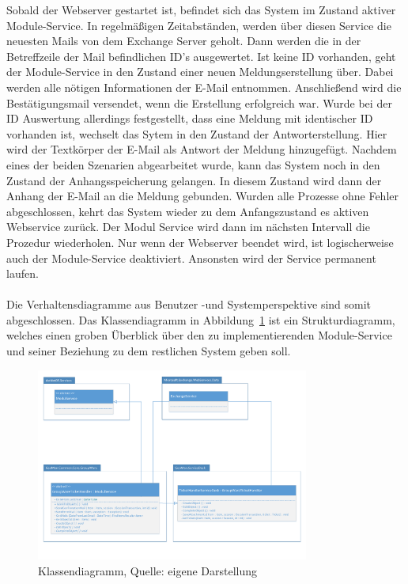 \noindent
Sobald der Webserver gestartet ist, befindet sich das System im Zustand aktiver Module-Service. In regelmäßigen Zeitabständen, werden über diesen Service die neuesten Mails von dem Exchange Server geholt. Dann werden die in der Betreffzeile der Mail befindlichen ID's ausgewertet. Ist keine ID vorhanden, geht der Module-Service in den Zustand einer neuen Meldungserstellung über. Dabei werden alle nötigen Informationen der E-Mail entnommen. Anschließend wird die Bestätigungsmail versendet, wenn die Erstellung erfolgreich war.\newline
Wurde bei der ID Auswertung allerdings festgestellt, dass eine Meldung mit identischer ID vorhanden ist, wechselt das Sytem in den Zustand der Antworterstellung. Hier wird der Textkörper der E-Mail als Antwort der Meldung hinzugefügt.\newline
Nachdem eines der beiden Szenarien abgearbeitet wurde, kann das System noch in den Zustand der Anhangsspeicherung gelangen. In diesem Zustand wird dann der Anhang der E-Mail an die Meldung gebunden. Wurden alle Prozesse ohne Fehler abgeschlossen, kehrt das System wieder zu dem Anfangszustand es aktiven Webservice zurück. Der Modul Service wird dann im nächsten Intervall die Prozedur wiederholen. Nur wenn der Webserver beendet wird, ist logischerweise auch der Module-Service deaktiviert. Ansonsten wird der Service permanent laufen.\\\\

\noindent
Die Verhaltensdiagramme aus Benutzer -und Systemperspektive sind somit abgeschlossen. Das Klassendiagramm in Abbildung~\ref{fig:Klassendiagramm} ist ein Strukturdiagramm, welches einen groben Überblick über den zu implementierenden Module-Service und seiner Beziehung zu dem restlichen System geben soll. 

\begin{figure}[h!]
\centering
\includegraphics[width=0.80\textwidth]{Abbildungen/Klassendiagramm.pdf}
	\caption[Klassendiagramm]{Klassendiagramm, Quelle: eigene Darstellung}
	\label{fig:Klassendiagramm}
\end{figure}

